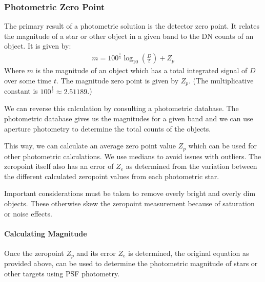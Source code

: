 \documentclass[letterpaper,11pt,english]{sphinxmanual}
\begin{document}
\sphinxstepscope


\subsubsection{Photometric Zero Point}
\label{\detokenize{technical/algorithms/photometric_zero_point:photometric-zero-point}}\label{\detokenize{technical/algorithms/photometric_zero_point:technical-algorithms-photometric-zero-point}}\label{\detokenize{technical/algorithms/photometric_zero_point::doc}}
\sphinxAtStartPar
The primary result of a photometric solution is the detector zero point.
It relates the magnitude of a star or other object in a given band to the
DN counts of an object. It is given by:
\begin{equation*}
\begin{split}m = 100^\frac{1}{5} \log_{10} \left( \frac{D}{t} \right) + Z_p\end{split}
\end{equation*}
\sphinxAtStartPar
Where \(m\) is the magnitude of an object which has a total integrated
signal of \(D\) over some time \(t\). The magnitude zero point is
given by \(Z_p\). (The multiplicative constant is
\(100^\frac{1}{5} \approx 2.51189\).)

\sphinxAtStartPar
We can reverse this calculation by consulting a photometric database. The
photometric database gives us the magnitudes for a given band and we can
use aperture photometry to determine the total counts of the objects.

\sphinxAtStartPar
This way, we can calculate an average zero point value \(Z_p\) which can
be used for other photometric calculations. We use medians to avoid issues
with outliers. The zero\sphinxhyphen{}point itself also has an error of \(Z_e\) as
determined from the variation between the different calculated zero\sphinxhyphen{}point
values from each photometric star.

\sphinxAtStartPar
Important considerations must be taken to remove overly bright and overly dim
objects. These otherwise skew the zero\sphinxhyphen{}point measurement because of saturation
or noise effects.


\paragraph{Calculating Magnitude}
\label{\detokenize{technical/algorithms/photometric_zero_point:calculating-magnitude}}
\sphinxAtStartPar
Once the zero\sphinxhyphen{}point \(Z_p\) and its error \(Z_e\) is determined, the
original equation as provided above, can be used to determine the photometric
magnitude of stars or other targets using PSF photometry.
\end{document}
